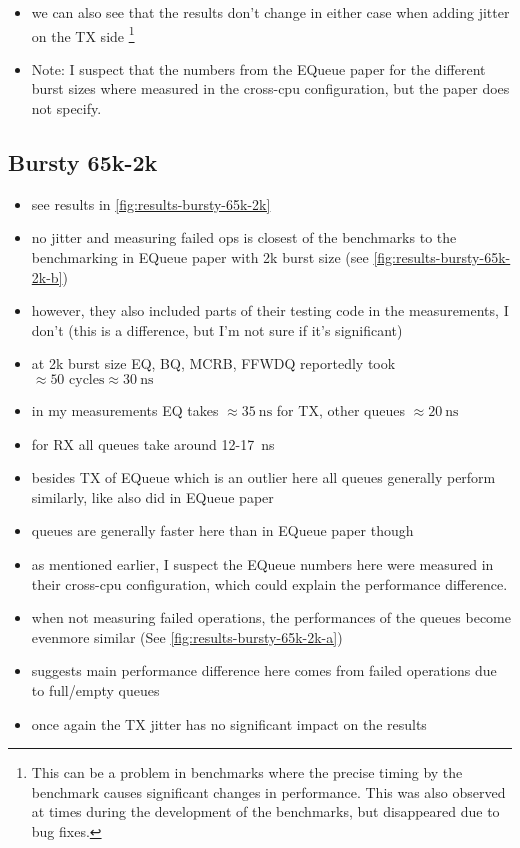 \begin{itemize}
    \item we can also see that the results don't change in either case when adding jitter on the TX side
        \footnote{This can be a problem in benchmarks where the precise timing by the benchmark causes significant changes in performance. This was also observed at times during the development of the benchmarks, but disappeared due to bug fixes. }
    \item Note: I suspect that the numbers from the EQueue paper for the different burst sizes where measured in the cross-cpu configuration, but the paper does not specify.
\end{itemize}

\subsection{Bursty 65k-2k}
\begin{itemize}
    \item see results in \autoref{fig:results-bursty-65k-2k}
    \item no jitter and measuring failed ops is closest of the benchmarks to the benchmarking in EQueue paper with 2k burst size (see \autoref{fig:results-bursty-65k-2k-b})
    \item however, they also included parts of their testing code in the measurements, I don't (this is a difference, but I'm not sure if it's significant)
    \item at 2k burst size EQ, BQ, MCRB, FFWDQ reportedly took $\approx 50\text{ cycles} \approx \SI{30}{\nano\second}$
    \item in my measurements EQ takes $\approx \SI{35}{\nano\second}$ for TX, other queues $\approx \SI{20}{\nano\second}$
    \item for RX all queues take around 12-\SI{17}{\nano\second}
    \item besides TX of EQueue which is an outlier here all queues generally perform similarly, like also did in EQueue paper
    \item queues are generally faster here than in EQueue paper though
    \item as mentioned earlier, I suspect the EQueue numbers here were measured in their cross-cpu configuration, which could explain the performance difference.
    \item when not measuring failed operations, the performances of the queues become evenmore similar (See \autoref{fig:results-bursty-65k-2k-a})
    \item suggests main performance difference here comes from failed operations due to full/empty queues
    \item once again the TX jitter has no significant impact on the results
\end{itemize}

